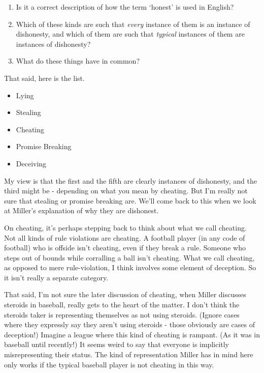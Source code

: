 \documentclass[
]{article}
\providecommand{\tightlist}{%
  \setlength{\itemsep}{0pt}\setlength{\parskip}{0pt}}
\begin{document}
\begin{enumerate}
\def\labelenumi{\arabic{enumi}.}
\tightlist
\item
  Is it a correct description of how the term `honest' is used in
  English?
\item
  Which of these kinds are such that \emph{every} instance of them is an
  instance of dishonesty, and which of them are such that \emph{typical}
  instances of them are instances of dishonesty?
\item
  What do these things have in common?
\end{enumerate}

That said, here is the list.

\begin{itemize}
\tightlist
\item
  Lying
\item
  Stealing
\item
  Cheating
\item
  Promise Breaking
\item
  Deceiving
\end{itemize}

My view is that the first and the fifth are clearly instances of
dishonesty, and the third might be - depending on what you mean by
cheating. But I'm really not sure that stealing or promise breaking are.
We'll come back to this when we look at Miller's explanation of why they
are dishonest.

On cheating, it's perhaps stepping back to think about what we call
cheating. Not all kinds of rule violations are cheating. A football
player (in any code of football) who is offside isn't cheating, even if
they break a rule. Someone who steps out of bounds while corralling a
ball isn't cheating. What we call cheating, as opposed to mere
rule-violation, I think involves some element of deception. So it isn't
really a separate category.

That said, I'm not sure the later discussion of cheating, when Miller
discusses steroids in baseball, really gets to the heart of the matter.
I don't think the steroids taker is representing themselves as not using
steroids. (Ignore cases where they expressly say they aren't using
steroids - those obviously are cases of deception!) Imagine a league
where this kind of cheating is rampant. (As it was in baseball until
recently!) It seems weird to say that everyone is implicitly
misrepresenting their status. The kind of representation Miller has in
mind here only works if the typical baseball player is not cheating in
this way.
\end{document}
